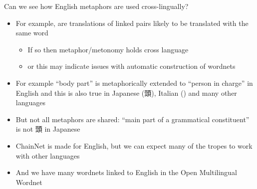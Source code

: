 \documentclass[dvipsnames]{beamer}
\begin{document}
\begin{frame}{Can we see how English metaphors are used cross-lingually?}
  \begin{itemize}
  \item For example, are translations of linked pairs likely to be
    translated with the same word
    \begin{itemize}
    \item If so then metaphor/metonomy holds cross language
    \item[\ldots] or this may indicate issues with automatic construction of wordnets
    \end{itemize}
  \item For example  ``body part'' is metaphorically
    extended to ``person in charge'' in English and this is also true in Japanese
    ({}頭), Italian () and many other languages
  \item But not all metaphors are shared:   ``main part of a grammatical constituent'' is not 頭 in Japanese
    \bigskip
  \item ChainNet is made for English, but we can expect many of the
    tropes to work with other languages
  \item And we have many wordnets linked to English in the Open Multilingual Wordnet
    

  \end{itemize}
\end{frame}
\end{document}
